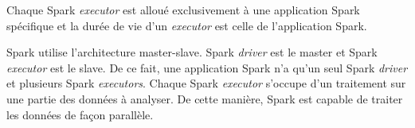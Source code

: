 Chaque Spark \textit{executor} est alloué exclusivement à une application Spark spécifique et la durée de vie d'un \textit{executor} est celle de l'application Spark. 

Spark utilise l'architecture master-slave. Spark \textit{driver} est le master et Spark \textit{executor} est le slave. De ce fait, une application Spark n'a qu'un seul Spark \textit{driver } et plusieurs Spark \textit{executors}. Chaque Spark \textit{executor} s'occupe d'un traitement  sur une partie  des données à analyser. De cette manière,  Spark est capable de traiter  les données de façon parallèle. 


